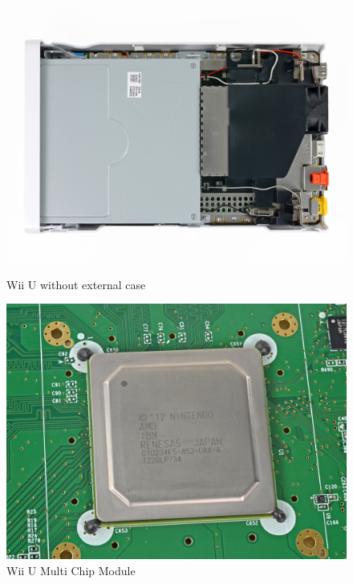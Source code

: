 \documentclass[11pt,a4paper,titlepage]{article}
\begin{document}
		\begin{figure}[ht]
			\centering
			\begin{minipage}{0.45\textwidth}
				\centering
				\includegraphics[width=\textwidth]{external_view.jpeg}
				\caption{Wii U without external case}
				\label{fig:external}
			\end{minipage}
			\begin{minipage}{0.45\textwidth}
				\centering
				\includegraphics[width=\textwidth]{CPU_&_GPU.png}
				\caption{Wii U Multi Chip Module}
				\label{fig:mcm}
			\end{minipage}
		\end{figure}
\end{document}
